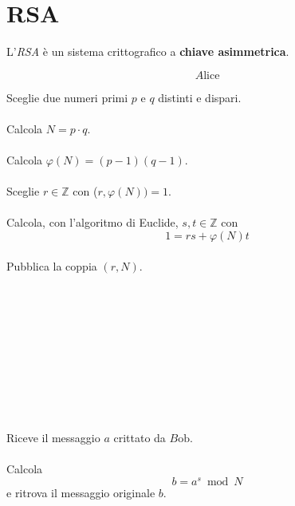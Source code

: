 \documentclass[a4paper,12pt, oneside]{book}
\begin{document}
\newpage
\section{RSA}
L'\textit{RSA} è un sistema crittografico a \textbf{chiave asimmetrica}.\\

\begin{minipage}{0.45\textwidth}

	$$A\mbox{lice}$$\linebreak[2]

	Sceglie due numeri primi $p$ e $q$ distinti e dispari.\\\\
	Calcola $N = p \cdot q$.\\\\
	Calcola $\varphi(N) = (p-1)(q-1)$.\\\\
	Sceglie $r \in \mathbb{Z}$ con ($r, \varphi(N))=1$.\\\\
	Calcola, con l'algoritmo di Euclide, $s,t \in \mathbb{Z}$ con $$1=rs+\varphi(N)t$$\\
	Pubblica la coppia $(r, N)$.\\\\\\\\\\\\\\\\\\\\\\

	Riceve il messaggio $a$ crittato da $B\mbox{ob}$.\\\\
	Calcola $$b = a^s \bmod N$$ e ritrova il messaggio originale $b$.


\end{minipage}%
\hfill
\end{document}
